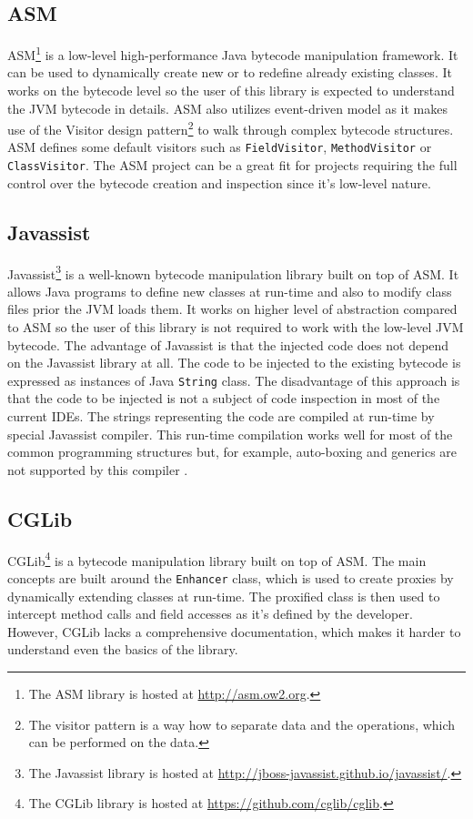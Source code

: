 \subsection{ASM}
\label{asm}
ASM\footnote{The ASM library is hosted at \url{http://asm.ow2.org}.} is a low-level high-performance Java bytecode manipulation framework. It can be used to dynamically create new or to redefine already existing classes. It works on the bytecode level so the user of this library is expected to understand the JVM bytecode in details. ASM also utilizes event-driven model as it makes use of the Visitor design pattern\footnote{The visitor pattern is a way how to separate data and the operations, which can be performed on the data.} to walk through complex bytecode structures. ASM defines some default visitors such as \texttt{FieldVisitor}, \texttt{MethodVisitor} or \texttt{ClassVisitor}. The ASM project can be a great fit for projects requiring the full control over the bytecode creation and inspection since it's low-level nature.
\subsection{Javassist}
\label{javassist}
Javassist\footnote{The Javassist library is hosted at \url{http://jboss-javassist.github.io/javassist/}.} is a well-known bytecode manipulation library built on top of ASM. It allows Java programs to define new classes at run-time and also to modify class files prior the JVM loads them. It works on higher level of abstraction compared to ASM so the user of this library is not required to work with the low-level JVM bytecode. The advantage of Javassist is that the injected code does not depend on the Javassist library at all. The code to be injected to the existing bytecode is expressed as instances of Java \texttt{String} class. The disadvantage of this approach is that the code to be injected is not a subject of code inspection in most of the current IDEs. The strings representing the code are compiled at run-time by special Javassist compiler. This run-time compilation works well for most of the common programming structures but, for example, auto-boxing and generics are not supported by this compiler \cite{JAVASSIST}.
\subsection{CGLib}
\label{cglib}
CGLib\footnote{The CGLib library is hosted at \url{https://github.com/cglib/cglib}.} is a bytecode manipulation library built on top of ASM. The main concepts are built around the \texttt{Enhancer} class, which is used to create proxies by dynamically extending classes at run-time. The proxified class is then used to intercept method calls and field accesses as it's defined by the developer. However, CGLib lacks a comprehensive documentation, which makes it harder to understand even the basics of the library.

